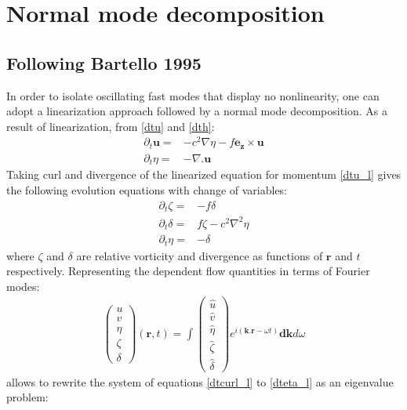 \documentclass[a4paper,12pt]{paper}
\begin{document}
\section{Normal mode decomposition}

\subsection{Following Bartello 1995}
In order to isolate oscillating fast modes that display no nonlinearity, one 
can adopt a linearization approach followed by a normal mode decomposition. 
As a result of linearization, from \eqref{dtu} and \eqref{dth}:
  \begin{align}
    \partial_t \mathbf u =& - c^2 \nabla \eta - f\mathbf{e_z} \times \mathbf u 
  \label{dtu_l} \\
    \partial_t \eta =& - \nabla.  \mathbf u \label{dth_l}
  \end{align}
Taking curl and divergence of the linearized equation for momentum 
\eqref{dtu_l} gives the following evolution equations with change of variables:
  \begin{align}
    \partial_t \zeta =& - f \delta
  \label{dtcurl_l} \\ 
    \partial_t \delta =&  f \zeta - c^2 \nabla^2 \eta \label{dtdiv_l} \\
    \partial_t \eta =& - \delta \label{dteta_l}
  \end{align}
where $\zeta$ and $\delta$ are relative vorticity and divergence as functions 
of $\mathbf{r}$ and $t$ respectively. Representing the dependent flow 
quantities in terms of Fourier modes:
  \begin{align}
  \begin{pmatrix}
      u \\ v \\ \eta \\ \zeta \\ \delta
  \end{pmatrix} (\mathbf{r},t)
  = \int  
  \begin{pmatrix}
      \hat{u} \\ \hat{v} \\ \hat{\eta} \\ \hat{\zeta} \\ \hat{\delta}
  \end{pmatrix} e^{i(\mathbf k . \mathbf{r} - \omega t)} \mathbf{dk} d\omega
  \end{align}
allows to rewrite the system of equations \eqref{dtcurl_l} to \eqref{dteta_l} 
as an eigenvalue problem:
\end{document}
